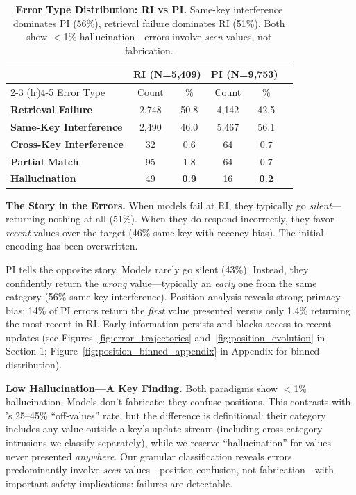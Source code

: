 \documentclass{article}
\begin{document}
\begin{table}[t]
\centering
\small
\caption{\textbf{Error Type Distribution: RI vs PI.} Same-key interference dominates PI (56\%), retrieval failure dominates RI (51\%). Both show $<$1\% hallucination---errors involve \textit{seen} values, not fabrication.}
\vspace{-4pt}
\begin{tabular}{lccccc}
\toprule
& \multicolumn{2}{c}{RI (N=5,409)} & \multicolumn{2}{c}{PI (N=9,753)} \\
\cmidrule(lr){2-3} \cmidrule(lr){4-5}
Error Type & Count & \% & Count & \% \\
\midrule
\textbf{Retrieval Failure} & 2,748 & 50.8 & 4,142 & 42.5 \\
\textbf{Same-Key Interference} & 2,490 & 46.0 & 5,467 & 56.1 \\
\textbf{Cross-Key Interference} & 32 & 0.6 & 64 & 0.7 \\
\textbf{Partial Match} & 95 & 1.8 & 64 & 0.7 \\
\textbf{Hallucination} & 49 & \textbf{0.9} & 16 & \textbf{0.2} \\
\bottomrule
\end{tabular}
\end{table}

\textbf{The Story in the Errors.}
When models fail at RI, they typically go \textit{silent}---returning nothing at all (51\%). When they do respond incorrectly, they favor \textit{recent} values over the target (46\% same-key with recency bias). The initial encoding has been overwritten.

PI tells the opposite story. Models rarely go silent (43\%). Instead, they confidently return the \textit{wrong} value---typically an \textit{early} one from the same category (56\% same-key interference). Position analysis reveals strong primacy bias: 14\% of PI errors return the \textit{first} value presented versus only 1.4\% returning the most recent in RI. Early information persists and blocks access to recent updates (see Figures~\ref{fig:error_trajectories} and~\ref{fig:position_evolution} in Section 1; Figure~\ref{fig:position_binned_appendix} in Appendix for binned distribution).

\textbf{Low Hallucination---A Key Finding.}
Both paradigms show $<$1\% hallucination. Models don't fabricate; they confuse positions. This contrasts with \citet{liu2024unable}'s 25--45\% ``off-values'' rate, but the difference is definitional: their category includes any value outside a key's update stream (including cross-category intrusions we classify separately), while we reserve ``hallucination'' for values never presented \textit{anywhere}. Our granular classification reveals errors predominantly involve \textit{seen} values---position confusion, not fabrication---with important safety implications: failures are detectable.
\end{document}
